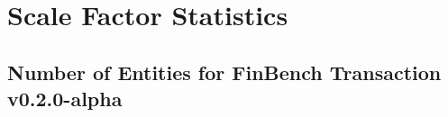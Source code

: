 \chapter{Scale Factor Statistics}
\label{sec:sf-statistics}

\section{Number of Entities for FinBench Transaction v0.2.0-alpha}


